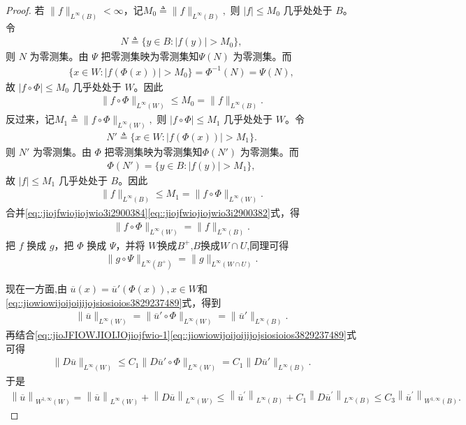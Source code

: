 \documentclass[../../main.tex]{subfiles}%
\begin{document}
\begin{proof}
若 \(\|f\|_{L^\infty(B)}<\infty\)，记$M_0\triangleq\|f\|_{L^\infty(B)},$
则 \(|f|\leqslant M_0\) 几乎处处于 \(B\)。令
\begin{align*}
N\triangleq\{y\in B:|f(y)|>M_0\},
\end{align*}
则 \(N\) 为零测集。由 \(\Psi\) 把零测集映为零测集知\(\Psi(N)\) 为零测集。而
\begin{align*}
\{x\in W:|f(\Phi(x))|>M_0\}=\Phi^{-1}(N)=\Psi(N),
\end{align*}
故 \(|f\circ\Phi|\leqslant M_0\) 几乎处处于 \(W\)。因此
\begin{align}\label{eq::jiojfwiojiojwio3i2900384}
\|f\circ\Phi\|_{L^\infty(W)}\leqslant M_0=\|f\|_{L^\infty(B)}.
\end{align}
反过来，记$M_1\triangleq\|f\circ\Phi\|_{L^\infty(W)},$
则 \(|f\circ\Phi|\leqslant M_1\) 几乎处处于 \(W\)。令
\begin{align*}
N'\triangleq\{x\in W:|f(\Phi(x))|>M_1\}.
\end{align*}
则 \(N'\) 为零测集。由 \(\Phi\) 把零测集映为零测集知\(\Phi(N')\) 为零测集。而
\begin{align*}
\Phi(N')=\{y\in B:|f(y)|>M_1\},
\end{align*}
故 \(|f|\leqslant M_1\) 几乎处处于 \(B\)。因此
\begin{align}\label{eq::jiojfwiojiojwio3i2900382}
\|f\|_{L^\infty(B)}\leqslant M_1=\|f\circ\Phi\|_{L^\infty(W)}.
\end{align}
合并\eqref{eq::jiojfwiojiojwio3i2900384}\eqref{eq::jiojfwiojiojwio3i2900382}式，得
\begin{align*}
\|f\circ\Phi\|_{L^\infty(W)}=\|f\|_{L^\infty(B)}.
\end{align*}
把 \(f\) 换成 \(g\)，把 \(\Phi\) 换成 \(\Psi\)，并将 \(W\)换成$B^+$,\(B\)换成$W\cap U$,同理可得
\begin{align*}
\|g\circ\Psi\|_{L^\infty(B^+)}=\|g\|_{L^\infty(W\cap U)}.
\end{align*}

现在一方面,由 \(\overline u(x)=\overline u'(\Phi(x)),x\in W\)和\eqref{eq::jiowiowijoijoijijojsiosioios3829237489}式，得到
\begin{align*}
\|\overline u\|_{L^\infty(W)}
=\|\overline u'\circ\Phi\|_{L^\infty(W)}
=\|\overline u'\|_{L^\infty(B)}.
\end{align*}
再结合\eqref{eq::jioJFIOWJIOIJOjiojfwio-1}\eqref{eq::jiowiowijoijoijijojsiosioios3829237489}式可得
\begin{align*}
\|D\overline u\|_{L^\infty(W)}
\leqslant C_1\|D\overline u'\circ\Phi\|_{L^\infty(W)}
=C_1\|D\overline u'\|_{L^\infty(B)}.
\end{align*}
于是
\begin{align}\label{eq::jiwjiofijoswjiowiow2390jw89023890}
\left\| \overline{u} \right\| _{W^{1,\infty}\left( W \right)}=\left\| \overline{u} \right\| _{L^{\infty}\left( W \right)}+\left\| D\overline{u} \right\| _{L^{\infty}\left( W \right)}\leqslant \left\| \overline{u}^{\prime} \right\| _{L^{\infty}\left( B \right)}+C_1\left\| D\overline{u}^{\prime} \right\| _{L^{\infty}\left( B \right)}\leqslant C_3\left\| \overline{u}^{\prime} \right\| _{W^{1,\infty}\left( B \right)}.
\end{align}


\end{proof}
\end{document}
